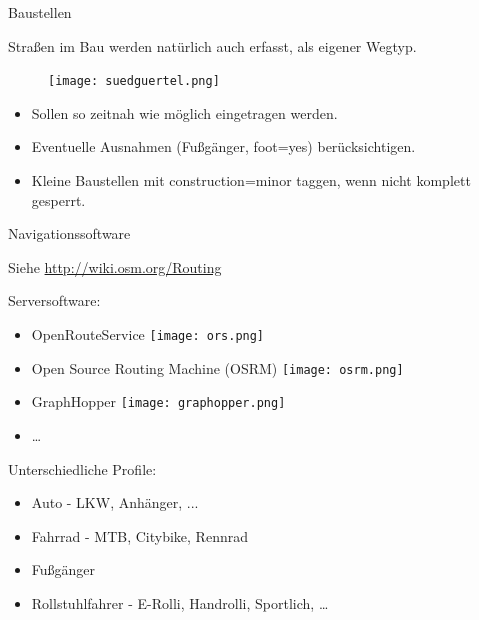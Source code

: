\documentclass{beamer}
\begin{document}
\begin{frame}{Baustellen}

Straßen im Bau werden natürlich auch erfasst, als eigener Wegtyp.

\begin{figure}
  \centering
  \texttt{[image: suedguertel.png]}
\end{figure}

\pause

\begin{itemize}
  \item Sollen so zeitnah wie möglich eingetragen werden.
  \item Eventuelle Ausnahmen (Fußgänger, foot=yes) berücksichtigen.
  \item Kleine Baustellen mit construction=minor taggen, wenn nicht komplett gesperrt.
\end{itemize}

\end{frame}

\begin{frame}{Navigationssoftware}

Siehe \url{http://wiki.osm.org/Routing}

 \vspace*{0.3cm}
Serversoftware:

 \vspace*{-0.3cm}
\begin{itemize}
  \item OpenRouteService \texttt{[image: ors.png]}
  \item Open Source Routing Machine (OSRM) \texttt{[image: osrm.png]}
  \item GraphHopper \texttt{[image: graphopper.png]}
  \item \dots
\end{itemize}

\pause

Unterschiedliche Profile:
\begin{itemize}
  \item Auto - LKW, Anhänger, ...
  \item Fahrrad - MTB, Citybike, Rennrad
  \item Fußgänger
  \item Rollstuhlfahrer - E-Rolli, Handrolli, Sportlich, \dots
\end{itemize}

\end{frame}
\end{document}
